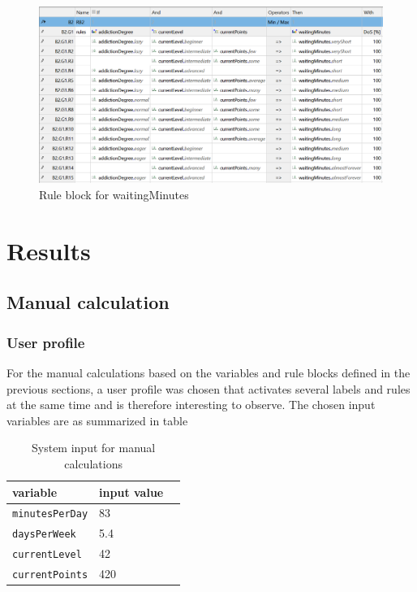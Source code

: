 \begin{figure}[H]
\centering
\includegraphics[width=\textwidth]{img/rb2}
\caption{Rule block for waitingMinutes}
\label{fig:rb2} 
\end{figure}

\chapter{Results}

\section{Manual calculation}

\subsection{User profile}

For the manual calculations based on the variables and rule blocks defined in the previous sections, a user profile was chosen that activates several labels and rules at the same time and is therefore interesting to observe. The chosen input variables are as summarized in table 

\begin{table}[H]
\centering
\begin{tabular}{@{}lll@{}}
\toprule
\textbf{variable}  & \textbf{input value} \\ 
\midrule
\texttt{minutesPerDay} & 83 \\
\texttt{daysPerWeek}  & 5.4 \\
\texttt{currentLevel} & 42 \\
\texttt{currentPoints} & 420 \\
\bottomrule
\end{tabular}
\caption{System input for manual calculations}
\label{tab:prof0}
\end{table}

